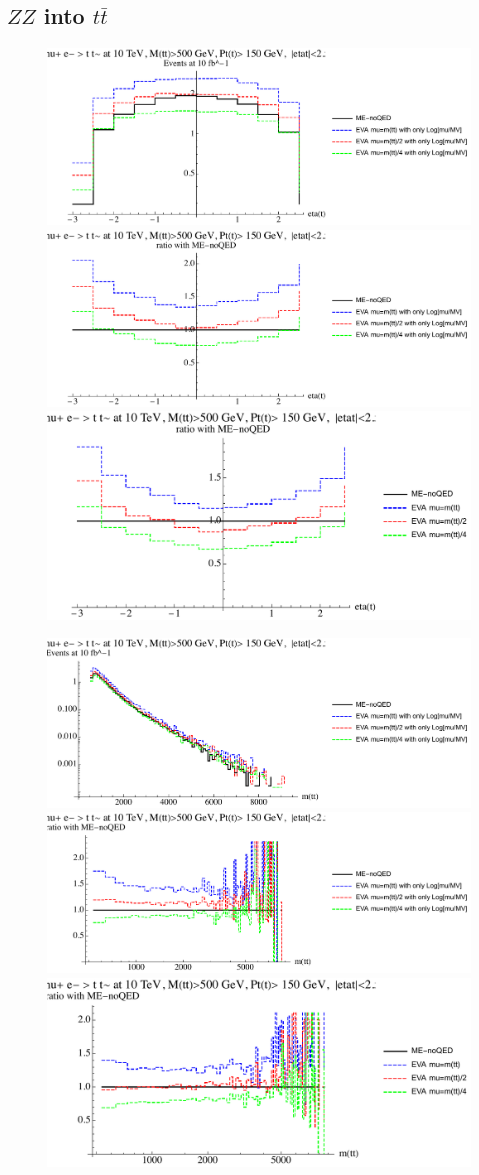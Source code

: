 \documentclass[a4paper,11pt]{article}
\begin{document}
\clearpage
\subsection{$ZZ$ into $t \bar t$}

\begin{figure}[ht]
\includegraphics[width=0.46\linewidth]{Notebooks/PlotDistr/ZZ_tt/10TeVcuts/plotetat.pdf}
\includegraphics[width=0.46\linewidth]{Notebooks/PlotDistr/ZZ_tt/10TeVcuts/plotetatratio1.pdf}
\includegraphics[width=0.46\linewidth]{Notebooks/PlotDistr/ZZ_tt/10TeVcuts/plotetatratio2.pdf}
\end{figure}

\begin{figure}[ht]
\includegraphics[width=0.46\linewidth]{Notebooks/PlotDistr/ZZ_tt/10TeVcuts/plotmtt.pdf}
\includegraphics[width=0.46\linewidth]{Notebooks/PlotDistr/ZZ_tt/10TeVcuts/plotmttratio1.pdf}
\includegraphics[width=0.46\linewidth]{Notebooks/PlotDistr/ZZ_tt/10TeVcuts/plotmttratio2.pdf}
\end{figure}
\end{document}
